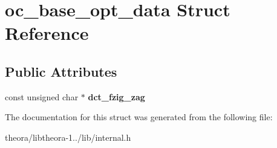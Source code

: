\hypertarget{structoc__base__opt__data}{\section{oc\+\_\+base\+\_\+opt\+\_\+data Struct Reference}
\label{structoc__base__opt__data}
}
\subsection*{Public Attributes}
\begin{DoxyCompactItemize}
\item 
\hypertarget{structoc__base__opt__data_aaf744fbc17ef21332ec2c7db10157517}{const unsigned char $\ast$ {\bfseries dct\+\_\+fzig\+\_\+zag}}\label{structoc__base__opt__data_aaf744fbc17ef21332ec2c7db10157517}

\end{DoxyCompactItemize}


The documentation for this struct was generated from the following file\+:\begin{DoxyCompactItemize}
\item 
theora/libtheora-\/1../lib/internal.\+h\end{DoxyCompactItemize}
